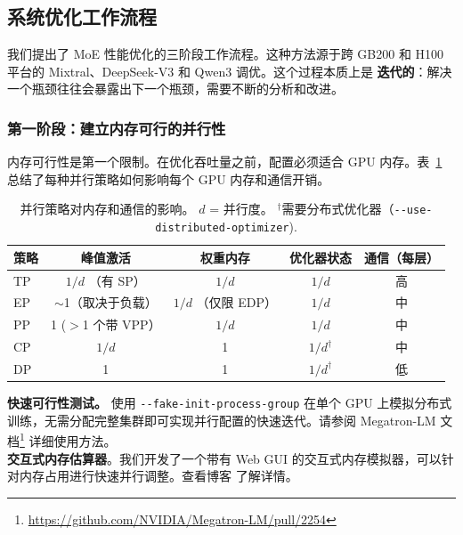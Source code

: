 \documentclass[10pt,logo,copyright]{nvidiatechreport_zh}
\begin{document}
\subsection{系统优化工作流程}\label{sec:best-practices-methodology}

我们提出了 MoE 性能优化的三阶段工作流程。这种方法源于跨 GB200 和 H100 平台的 Mixtral、DeepSeek-V3 和 Qwen3 调优。这个过程本质上是 \textbf{迭代的}：解决一个瓶颈往往会暴露出下一个瓶颈，需要不断的分析和改进。

\subsubsection{第一阶段：建立内存可行的并行性}

内存可行性是第一个限制。在优化吞吐量之前，配置必须适合 GPU 内存。表~\ref{tab:parallel-memory-impact} 总结了每种并行策略如何影响每个 GPU 内存和通信开销。

\begin{table}[ht]
\centering
\caption{并行策略对内存和通信的影响。 $d$ = 并行度。 $^\dagger$需要分布式优化器（\texttt{-{}-use-distributed-optimizer}).}
\label{tab:parallel-memory-impact}
\begin{tabular}{lcccc}
\toprule
\textbf{策略} & \textbf{峰值激活} & \textbf{权重内存} & \textbf{优化器状态} & \textbf{通信（每层）} \\
\midrule
TP & $1/d$ （有 SP） & $1/d$ & $1/d$ & 高 \\
EP & $\sim$1（取决于负载） & $1/d$ （仅限 EDP） & $1/d$ & 中 \\
PP & 1 ($>$1 个带 VPP） & $1/d$ & $1/d$ & 中 \\
CP & $1/d$ & 1 & $1/d^\dagger$ & 中 \\
DP & 1 & 1 & $1/d^\dagger$ & 低 \\
\bottomrule
\end{tabular}
\end{table}

\begin{notebox}
\textbf{快速可行性测试。} 使用 \texttt{-{}-fake-init-process-group} 在单个 GPU 上模拟分布式训练，无需分配完整集群即可实现并行配置的快速迭代。请参阅 Megatron-LM 文档\footnote{\url{https://github.com/NVIDIA/Megatron-LM/pull/2254}} 详细使用方法。\\
\textbf{交互式内存估算器}。我们开发了一个带有 Web GUI 的交互式内存模拟器，可以针对内存占用进行快速并行调整。查看博客\cite{nvidia_memory_estimator_blog} 了解详情。

\end{notebox}
\end{document}
